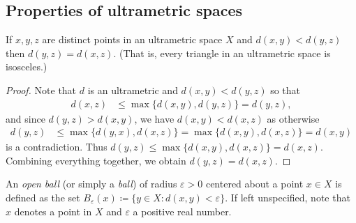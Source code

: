 \subsection{Properties of ultrametric spaces}
\begin{lemma}
If \( x, y, z \) are distinct points in an ultrametric space \( X \) and \( d(x,y) < d(y,z) \) then \( d(y,z) = d(x,z) \). (That is, every triangle in an ultrametric space is isosceles.)
\end{lemma}
\begin{proof}
Note that \( d \) is an ultrametric and \( d(x,y) < d(y,z) \) so that
\begin{align*}
	d(x, z) &\leq \max \{ d(x,y), d(y, z) \} = d(y,z),
\end{align*}
and since \( d(y,z) > d(x,y) \), we have \( d(x,y) < d(x,z) \) as otherwise
\begin{align*}
	d(y,z) &\leq \max \{ d(y, x) , d(x, z) \} = \max \{ d(x,y) , d(x,z) \} = d(x,y)
\end{align*}
is a contradiction. Thus \( d(y,z) \leq \max \{ d(x,y), d(x,z) \} = d(x,z) \). Combining everything together, we obtain \( d(y,z) = d(x,z) \).
\end{proof}



An \emph{open ball} (or simply a \emph{ball}) of radius \( \varepsilon > 0 \) centered about a point \( x \in  X \) is defined as the set \( B_{\varepsilon }(x) \coloneqq \{ y \in X : d(x,y) < \varepsilon  \}  \). If left unspecified, note that \( x \) denotes a point in \( X \) and \( \varepsilon  \) a positive real number. 

